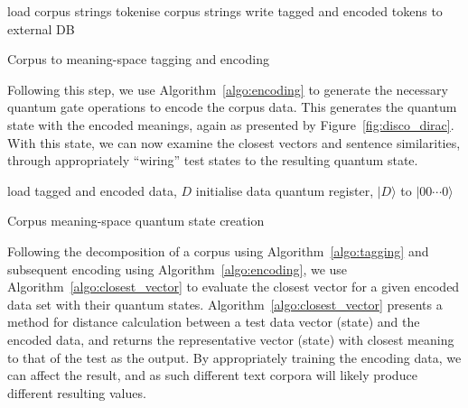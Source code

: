 \begin{algorithm}\label{algo:tagging}
    load corpus strings\;
    tokenise corpus strings\;
    write tagged and encoded tokens to external DB\;
    \caption{Corpus to meaning-space tagging and encoding}
\end{algorithm}

\newpage
Following this step, we use Algorithm~\ref{algo:encoding} to generate the necessary quantum gate operations to encode the corpus data. This generates the quantum state with the encoded meanings, again as presented by Figure~\ref{fig:disco_dirac}. With this state, we can now examine the closest vectors and sentence similarities, through appropriately ``wiring'' test states to the resulting quantum state.

\begin{algorithm}\label{algo:encoding}
    load tagged and encoded data, $D$\;
    initialise data quantum register, $\vert D\rangle$ to $\vert 00\cdots 0\rangle$\;
    \caption{Corpus meaning-space quantum state creation}
\end{algorithm}


Following the decomposition of a corpus using Algorithm~\ref{algo:tagging} and subsequent encoding using Algorithm~\ref{algo:encoding}, we use Algorithm~\ref{algo:closest_vector} to evaluate the closest vector for a given encoded data set with their quantum states. Algorithm~\ref{algo:closest_vector} presents a method for distance calculation between a test data vector (state) and the encoded data, and returns the representative vector (state) with closest meaning to that of the test as the output. By appropriately training the encoding data, we can affect the result, and as such different text corpora will likely produce different resulting values.

